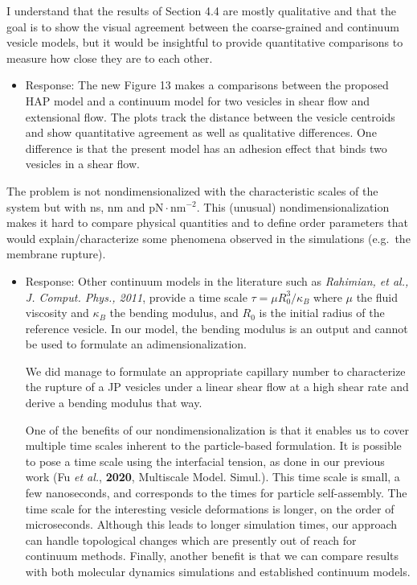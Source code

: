 \documentclass[11pt]{article}
\newcommand{\comment}[1]{{\color{blue} #1}}
\begin{document}
\noindent
\comment{I understand that the results of Section 4.4 are mostly
qualitative and that the goal is to show the visual agreement between
the coarse-grained and continuum vesicle models, but it would be
insightful to provide quantitative comparisons to measure how close they
are to each other.}
\begin{itemize}
  
\item Response: The new Figure 13
  makes a comparisons between the proposed HAP model and a continuum model for two vesicles
  in shear flow and extensional flow.
  The plots track the distance between the vesicle centroids 
  and show quantitative agreement as well as qualitative differences.
  One difference is that the present model has an adhesion effect that
  binds two vesicles in a shear flow.  
\end{itemize}

\noindent
\comment{The problem is not nondimensionalized with the characteristic
scales of the system but with ns, nm and $\text{pN} \cdot
\text{nm}^{-2}$. This (unusual) nondimensionalization makes it hard to
compare physical quantities and to define order parameters that would
explain/characterize some phenomena observed in the simulations
(e.g.~the membrane rupture).}

\begin{itemize}
  \item Response:
Other continuum models in the literature
such as  \emph{Rahimian, et al., J. Comput. Phys., 2011}, 
 provide a time scale $\tau = \mu R_0^3/\kappa_B$ where $\mu$ the fluid
    viscosity and $\kappa_B$ the bending modulus, and 
    $R_0$ is the initial radius of the reference vesicle.
    In our model, the bending modulus is an output and cannot be used
    to formulate an adimensionalization.

    We did manage to formulate an appropriate capillary number to characterize the rupture of a JP vesicles
    under a linear shear flow at a high shear rate and derive a bending modulus that way. 
    
    One of the benefits of our nondimensionalization is that it enables
    us to cover multiple time scales inherent to the particle-based formulation. 
    It is possible to pose a time scale using the interfacial tension, as done
    in our previous work (Fu {\sl et al.}, {\bf 2020}, Multiscale Model. Simul.).
    This time scale is small, a few nanoseconds, and
    corresponds to the times for particle self-assembly.
    The time scale for the interesting vesicle deformations is longer,
    on the order of microseconds.
    Although this leads to longer simulation times, our approach can
    handle topological changes which are presently out of reach for continuum methods. 
    Finally, another benefit is that we can compare
    results with both molecular dynamics simulations
    and established continuum models.  

\end{itemize}
\end{document}
